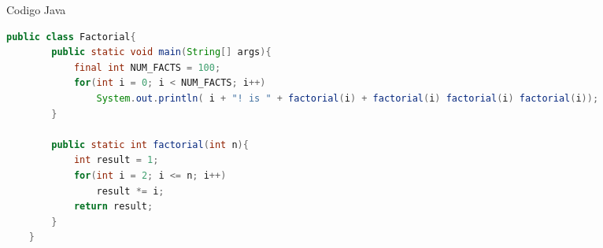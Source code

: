 \begin{codigo}
  \caption{Codigo Java}
  \begin{lstlisting}[language = Java]
    public class Factorial{
        public static void main(String[] args){   
            final int NUM_FACTS = 100;
            for(int i = 0; i < NUM_FACTS; i++)
                System.out.println( i + "! is " + factorial(i) + factorial(i) factorial(i) factorial(i));
        }

        public static int factorial(int n){
            int result = 1;
            for(int i = 2; i <= n; i++)
                result *= i;
            return result;
        }
    }
\end{lstlisting}
\end{codigo}